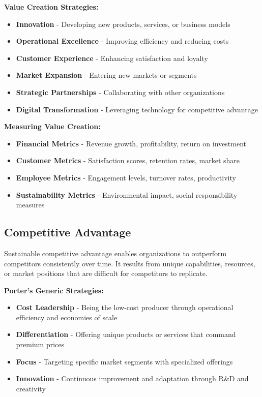 \documentclass[12pt]{article}
\begin{document}
\textbf{Value Creation Strategies:}
\begin{itemize}
    \item \textbf{Innovation} - Developing new products, services, or business models
    \item \textbf{Operational Excellence} - Improving efficiency and reducing costs
    \item \textbf{Customer Experience} - Enhancing satisfaction and loyalty
    \item \textbf{Market Expansion} - Entering new markets or segments
    \item \textbf{Strategic Partnerships} - Collaborating with other organizations
    \item \textbf{Digital Transformation} - Leveraging technology for competitive advantage
\end{itemize}

\textbf{Measuring Value Creation:}
\begin{itemize}
    \item \textbf{Financial Metrics} - Revenue growth, profitability, return on investment
    \item \textbf{Customer Metrics} - Satisfaction scores, retention rates, market share
    \item \textbf{Employee Metrics} - Engagement levels, turnover rates, productivity
    \item \textbf{Sustainability Metrics} - Environmental impact, social responsibility measures
\end{itemize}

\subsection{Competitive Advantage}
Sustainable competitive advantage enables organizations to outperform competitors consistently over time. It results from unique capabilities, resources, or market positions that are difficult for competitors to replicate.

\textbf{Porter's Generic Strategies:}
\begin{itemize}
    \item \textbf{Cost Leadership} - Being the low-cost producer through operational efficiency and economies of scale
    \item \textbf{Differentiation} - Offering unique products or services that command premium prices
    \item \textbf{Focus} - Targeting specific market segments with specialized offerings
    \item \textbf{Innovation} - Continuous improvement and adaptation through R\&D and creativity
\end{itemize}
\end{document}
